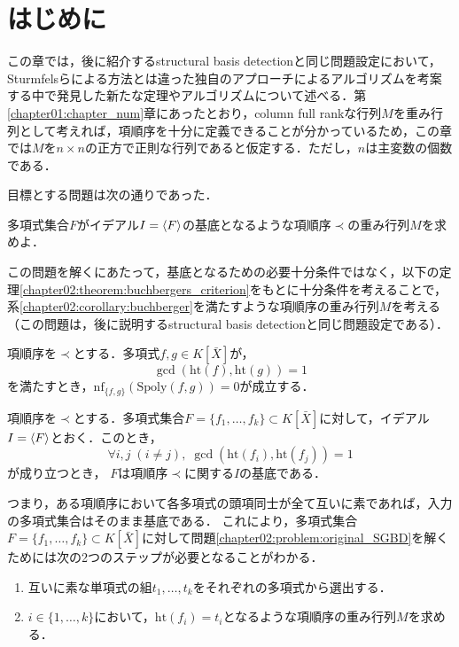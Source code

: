 \section{はじめに}
この章では，後に紹介するstructural \groebner{} basis detectionと同じ問題設定において，Sturmfelsらによる方法とは違った独自のアプローチによるアルゴリズムを考案する中で発見した新たな定理やアルゴリズムについて述べる．第\ref{chapter01:chapter_num}章にあったとおり，column full rankな行列$M$を重み行列として考えれば，項順序を十分に定義できることが分かっているため，この章では$M$を$n \times n$の正方で正則な行列であると仮定する．ただし，$n$は主変数の個数である．
\par
目標とする問題は次の通りであった．
\begin{problem}
	\label{chapter02:problem:original_SGBD}
	多項式集合$F$がイデアル$I = \langle F \rangle$の\groebner{}基底となるような項順序$\prec$の重み行列$M$を求めよ．
\end{problem}
この問題を解くにあたって，\groebner{}基底となるための必要十分条件ではなく，以下の定理\ref{chapter02:theorem:buchbergers_criterion}をもとに十分条件を考えることで，系\ref{chapter02:corollary:buchberger}を満たすような項順序の重み行列$M$を考える（この問題は，後に説明するstructural \groebner{} basis detectionと同じ問題設定である）．
\begin{theorem}[Buchbergerの判定条件]
	\label{chapter02:theorem:buchbergers_criterion}
	項順序を$\prec$とする．多項式$f, g \in K[\bar{X}]$が，
	$$\gcd(\mathrm{ht}(f), \mathrm{ht}(g))=1$$を満たすとき，$\mathrm{nf}_{\{f, g\}}(\mathrm{Spoly}(f, g)) = 0$が成立する．
	\end{theorem}
	\begin{corollary}
	\label{chapter02:corollary:buchberger}
	項順序を$\prec$とする．多項式集合$F=\{ f_1, \dots, f_k \} \subset K[\bar{X}]$に対して，イデアル$I = \langle F \rangle$とおく．このとき，
	$$\forall i, j \; (i \ne j), \; \gcd(\mathrm{ht}(f_i), \mathrm{ht}(f_j))=1$$
	が成り立つとき， $F$は項順序$\prec$に関する$I$の\groebner{}基底である．
\end{corollary}
つまり，ある項順序において各多項式の頭項同士が全て互いに素であれば，入力の多項式集合はそのまま\groebner{}基底である．
これにより，多項式集合$F = \{f_1, \dots, f_k\}\subset K[\bar{X}]$に対して問題\ref{chapter02:problem:original_SGBD}を解くためには次の2つのステップが必要となることがわかる．
\par
\begin{enumerate}
	\item 互いに素な単項式の組$t_1, \dots, t_k$をそれぞれの多項式から選出する．
	\item $i \in \{1, \dots, k\}$において，$\mathrm{ht}(f_i) = t_i$となるような項順序の重み行列$M$を求める．
\end{enumerate}




